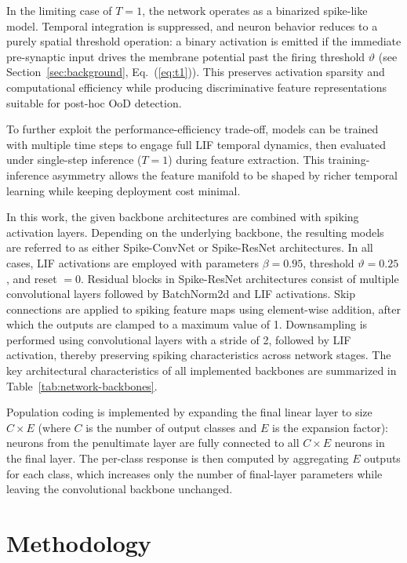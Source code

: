 \documentclass{ieeeaccess}
\begin{document}
In the limiting case of $T=1$, the network operates as a binarized spike-like model. Temporal integration is suppressed, and neuron behavior reduces to a purely spatial threshold operation: a binary activation is emitted if the immediate pre-synaptic input drives the membrane potential past the firing threshold $\vartheta$ (see Section~\ref{sec:background}, Eq.~(\ref{eq:t1})). This preserves activation sparsity and computational efficiency while producing discriminative feature representations suitable for post-hoc OoD detection.

To further exploit the performance-efficiency trade-off, models can be trained with multiple time steps to engage full LIF temporal dynamics, then evaluated under single-step inference ($T=1$) during feature extraction. This training-inference asymmetry allows the feature manifold to be shaped by richer temporal learning while keeping deployment cost minimal.

In this work, the given backbone architectures are combined with spiking activation layers. Depending on the underlying backbone, the resulting models are referred to as either Spike-ConvNet or Spike-ResNet architectures. In all cases, LIF activations are employed with parameters $\beta=0.95$, threshold $\vartheta=0.25$, and reset $=0$. Residual blocks in Spike-ResNet architectures consist of multiple convolutional layers followed by BatchNorm2d and LIF activations. Skip connections are applied to spiking feature maps using element-wise addition, after which the outputs are clamped to a maximum value of 1. Downsampling is performed using convolutional layers with a stride of 2, followed by LIF activation, thereby preserving spiking characteristics across network stages. The key architectural characteristics of all implemented backbones are summarized in Table~\ref{tab:network-backbones}.

Population coding is implemented by expanding the final linear layer to size $C\times E$ (where $C$ is the number of output classes and $E$ is the expansion factor): neurons from the penultimate layer are fully connected to all $C\times E$ neurons in the final layer. The per-class response is then computed by aggregating $E$ outputs for each class, which increases only the number of final-layer parameters while leaving the convolutional backbone unchanged.


\section{Methodology}
\label{sec:methodology}
\end{document}
